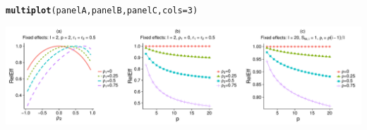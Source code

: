 \documentclass{article}\usepackage[]{graphicx}\usepackage[]{color}
\makeatletter
\def\maxwidth{ %
  \ifdim\Gin@nat@width>\linewidth
    \linewidth
  \else
    \Gin@nat@width
  \fi
}
\newcommand{\hlnum}[1]{\textcolor[rgb]{0.686,0.059,0.569}{#1}}%
\newcommand{\hlstd}[1]{\textcolor[rgb]{0.345,0.345,0.345}{#1}}%
\newcommand{\hlkwc}[1]{\textcolor[rgb]{0.333,0.667,0.333}{#1}}%
\newcommand{\hlkwd}[1]{\textcolor[rgb]{0.737,0.353,0.396}{\textbf{#1}}}%
\newenvironment{kframe}{%
 \def\at@end@of@kframe{}%
 \ifinner\ifhmode%
  \def\at@end@of@kframe{\end{minipage}}%
  \begin{minipage}{\columnwidth}%
 \fi\fi%
 \def\FrameCommand##1{\hskip\@totalleftmargin \hskip-\fboxsep
 \colorbox{shadecolor}{##1}\hskip-\fboxsep
     \hskip-\linewidth \hskip-\@totalleftmargin \hskip\columnwidth}%
 \MakeFramed {\advance\hsize-\width
   \@totalleftmargin\z@ \linewidth\hsize
   \@setminipage}}%
 {\par\unskip\endMakeFramed%
 \at@end@of@kframe}
\newenvironment{knitrout}{}{} %
\makeatother
\begin{document}
\begin{knitrout}
\color{fgcolor}\begin{kframe}
\begin{alltt}
\hlkwd{multiplot}\hlstd{(panelA, panelB, panelC,} \hlkwc{cols}\hlstd{=}\hlnum{3}\hlstd{)}
\end{alltt}


{\ttfamily\noindent\itshape\color{messagecolor}{\#\# Loading required package: grid}}\end{kframe}

{\centering \includegraphics[width=\maxwidth]{figures/Figure_1_panels_abc-1} 

}



\end{knitrout}
\end{document}
